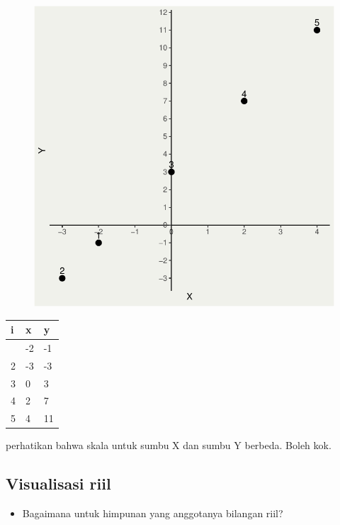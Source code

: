 \documentclass[
  letterpaper,
  DIV=11,
  numbers=noendperiod]{scrartcl}
\providecommand{\tightlist}{%
  \setlength{\itemsep}{0pt}\setlength{\parskip}{0pt}}\usepackage{longtable,booktabs,array}
\begin{document}
\begin{figure}[H]

{\centering \includegraphics{index_files/figure-pdf/unnamed-chunk-2-1.pdf}

}

\end{figure}

\begin{longtable}[]{@{}lll@{}}
\toprule\noalign{}
i & x & y \\
\midrule\noalign{}
\endhead
\bottomrule\noalign{}
\endlastfoot
1 & -2 & -1 \\
2 & -3 & -3 \\
3 & 0 & 3 \\
4 & 2 & 7 \\
5 & 4 & 11 \\
\end{longtable}

perhatikan bahwa skala untuk sumbu X dan sumbu Y berbeda. Boleh kok.

\hypertarget{visualisasi-riil}{%
\subsection{Visualisasi riil}\label{visualisasi-riil}}

\begin{itemize}
\tightlist
\item
  Bagaimana untuk himpunan yang anggotanya bilangan riil?
\end{itemize}
\end{document}
